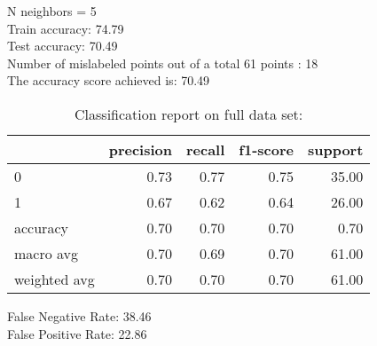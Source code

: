 N neighbors = 5\\
Train accuracy: 74.79%
\\Test accuracy: 70.49%
\\Number of mislabeled points out of a total 61 points : 18
\\The accuracy score achieved is: 70.49 %
\begin{table}[H]
\caption{Classification report on full data set:}
\begin{center}
\begin{tabular}{lrrrr}
\toprule
{} &  precision &  recall &  f1-score &  support \\
\midrule
0            &       0.73 &    0.77 &      0.75 &    35.00 \\
1            &       0.67 &    0.62 &      0.64 &    26.00 \\
accuracy     &       0.70 &    0.70 &      0.70 &     0.70 \\
macro avg    &       0.70 &    0.69 &      0.70 &    61.00 \\
weighted avg &       0.70 &    0.70 &      0.70 &    61.00 \\
\bottomrule
\end{tabular}

\label{k_nearest_neighbors_class}
\end{center}
\end{table}
\noindent
False Negative Rate: 38.46
\\False Positive Rate: 22.86
